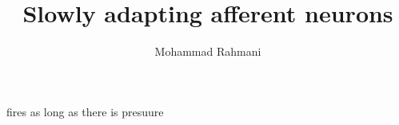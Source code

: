 \documentclass[a4paper]{article}
\title{Slowly adapting afferent neurons}
\date{}
\author{Mohammad Rahmani}
\begin{document}
    \maketitle
    
    fires as long as there is presuure
    
    
\end{document}
